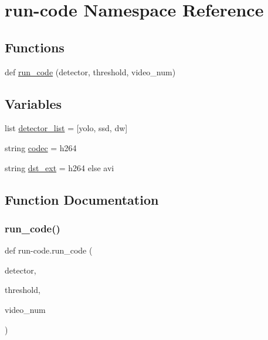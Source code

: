 \hypertarget{namespacerun-code}{}\section{run-\/code Namespace Reference}
\label{namespacerun-code}
\subsection*{Functions}
\begin{DoxyCompactItemize}
\item 
def \mbox{\hyperlink{namespacerun-code_a133159db4bd6772312bbf5daa57bd0b3}{run\+\_\+code}} (detector, threshold, video\+\_\+num)
\end{DoxyCompactItemize}
\subsection*{Variables}
\begin{DoxyCompactItemize}
\item 
list \mbox{\hyperlink{namespacerun-code_a964a9f5de3531be378abf4081befc9d2}{detector\+\_\+list}} = \mbox{[}\textquotesingle{}yolo\textquotesingle{}, \textquotesingle{}ssd\textquotesingle{}, \textquotesingle{}dw\textquotesingle{}\mbox{]}
\item 
string \mbox{\hyperlink{namespacerun-code_a8fd3f499f581f73e709f1dccdcf91b3f}{codec}} = \textquotesingle{}h264\textquotesingle{}
\item 
string \mbox{\hyperlink{namespacerun-code_ac7f7fa370ecddff28d73a3ed6c0375e5}{dst\+\_\+ext}} = \textquotesingle{}h264\textquotesingle{} else \textquotesingle{}avi\textquotesingle{}
\end{DoxyCompactItemize}


\subsection{Function Documentation}
\mbox{\label{namespacerun-code_a133159db4bd6772312bbf5daa57bd0b3}} 
\subsubsection{\texorpdfstring{run\+\_\+code()}{run\_code()}}
{\footnotesize\ttfamily def run-\/code.\+run\+\_\+code (\begin{DoxyParamCaption}\item[{}]{detector,  }\item[{}]{threshold,  }\item[{}]{video\+\_\+num }\end{DoxyParamCaption})}



